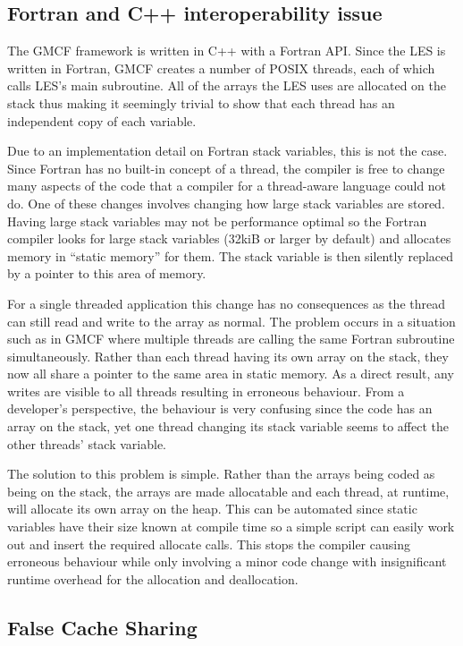 \subsection{Fortran and C++ interoperability issue}
\label{sec:fortrancppinteroperability}

The GMCF framework is written in C++ with a Fortran API. Since the LES is
written in Fortran, GMCF creates a number of POSIX threads, each of which calls
LES's main subroutine. All of the arrays the LES uses are allocated on the stack
thus making it seemingly trivial to show that each thread has an independent
copy of each variable.

Due to an implementation detail on Fortran stack variables, this is not the
case. Since Fortran has no built-in concept of a thread, the compiler is free to
change many aspects of the code that a compiler for a thread-aware language
could not do. One of these changes involves changing how large stack variables
are stored. Having large stack variables may not be performance optimal so the
Fortran compiler looks for large stack variables (32kiB or larger by default)
and allocates memory in ``static memory'' for them. The stack variable is then
silently replaced by a pointer to this area of memory.

For a single threaded application this change has no consequences as the thread
can still read and write to the array as normal. The problem occurs in a
situation such as in GMCF where multiple threads are calling the same Fortran
subroutine simultaneously. Rather than each thread having its own array on the
stack, they now all share a pointer to the same area in static memory. As a
direct result, any writes are visible to all threads resulting in erroneous
behaviour. From a developer's perspective, the behaviour is very confusing since
the code has an array on the stack, yet one thread changing its stack variable
seems to affect the other threads' stack variable.

The solution to this problem is simple. Rather than the arrays being coded as
being on the stack, the arrays are made allocatable and each thread, at runtime,
will allocate its own array on the heap. This can be automated since static
variables have their size known at compile time so a simple script can easily
work out and insert the required allocate calls. This stops the compiler causing
erroneous behaviour while only involving a minor code change with insignificant
runtime overhead for the allocation and deallocation.

\subsection{False Cache Sharing}

